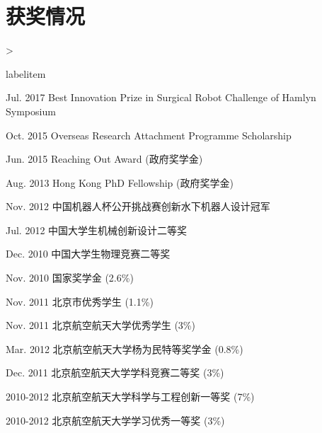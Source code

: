 \documentclass[10pt,letterpaper]{article}
\makeatletter
\newenvironment{dateitemize}%
{\ifnum \@itemdepth >\thr@@\@toodeep\else
\advance\@itemdepth\@ne
\edef\@itemitem{labelitem\romannumeral\the\@itemdepth}%
\expandafter
\list
\csname\@itemitem\endcsname
{\advance\rightmargin3cm
\def\makelabel##1{\hss\llap{\textbullet}\rlap{\hbox to \dimexpr\linewidth+\rightmargin+\itemsep\relax{\hss##1}}}}%
\fi}
{\endlist}%
\makeatother
\begin{document}
\section*{获奖情况}

\begin{dateitemize}
    \item[Jul. 2017] Best Innovation Prize in Surgical Robot Challenge of Hamlyn Symposium
    \item[Oct. 2015] Overseas Research Attachment Programme Scholarship
    \item[Jun. 2015] Reaching Out Award (政府奖学金)
    \item[Aug. 2013] Hong Kong PhD Fellowship (政府奖学金)
    \item[Nov. 2012] 中国机器人杯公开挑战赛创新水下机器人设计冠军
    \item[Jul. 2012] 中国大学生机械创新设计二等奖
    \item[Dec. 2010] 中国大学生物理竞赛二等奖
    \item[Nov. 2010] 国家奖学金 (2.6\%)
    \item[Nov. 2011] 北京市优秀学生 (1.1\%)
    \item[Nov. 2011] 北京航空航天大学优秀学生 (3\%)
    \item[Mar. 2012] 北京航空航天大学杨为民特等奖学金 (0.8\%)
    \item[Dec. 2011] 北京航空航天大学学科竞赛二等奖 (3\%)
    \item[2010-2012] 北京航空航天大学科学与工程创新一等奖 (7\%)
    \item[2010-2012] 北京航空航天大学学习优秀一等奖 (3\%)

\end{dateitemize}

\end{document}
